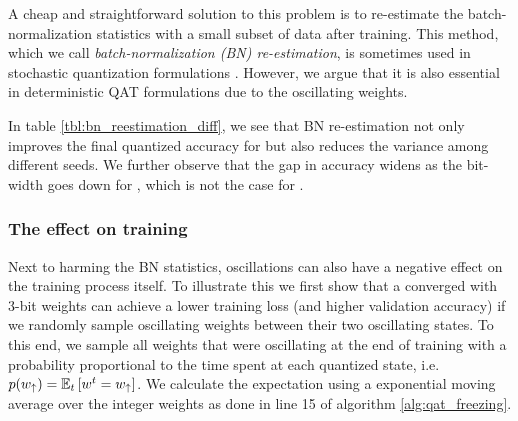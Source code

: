 

A cheap and straightforward solution to this problem is to re-estimate the batch-normalization statistics with a small subset of data after training. This method, which we call \textit{batch-normalization (BN) re-estimation}, is sometimes used in stochastic quantization formulations \citep{peters2018probabilistic,louizos2018relaxed}. However, we argue that it is also essential in deterministic QAT formulations due to the oscillating weights. 

In table \ref{tbl:bn_reestimation_diff}, we see that BN re-estimation not only improves the final quantized accuracy for  but also reduces the variance among different seeds. We further observe that the gap in accuracy widens as the bit-width goes down for , which is not the case for . 











\subsubsection{The effect on training}
Next to harming the BN statistics, oscillations can also have a negative effect on the training process itself. 
To illustrate this we first show that a converged  with 3-bit weights can achieve a lower training loss (and higher validation accuracy) if we randomly sample oscillating weights between their two oscillating states.
To this end, we sample all weights that were oscillating at the end of training with a probability proportional to the time spent at each quantized state, i.e. $p(w_{\uparrow}) = \mathop{\mathbb{E}_{t}}\left[w^t = w_{\uparrow}\right]$. We calculate the expectation using a exponential moving average over the integer weights as done in line 15 of algorithm \ref{alg:qat_freezing}.

